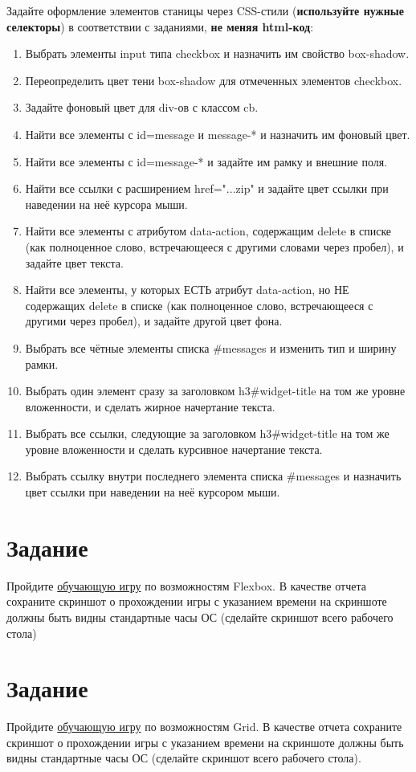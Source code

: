 \documentclass[a4paper,12pt]{extarticle}
\begin{document}
Задайте оформление элементов станицы через CSS-стили (\textbf{используйте нужные селекторы}) в
соответствии с заданиями, \textbf{не меняя html-код}:
\begin{enumerate}
  \item Выбрать элементы input типа checkbox и назначить им свойство box-shadow.
  \item Переопределить цвет тени box-shadow для отмеченных элементов checkbox.
  \item Задайте фоновый цвет для div-ов с классом cb.
  \item Найти все элементы с id=message и message-* и назначить им фоновый цвет.
  \item Найти все элементы с id=message-* и задайте им рамку и внешние поля.
  \item Найти все ссылки с расширением href="...zip" и задайте цвет ссылки при наведении на неё курсора мыши.
  \item Найти все элементы с атрибутом data-action, содержащим delete в списке (как полноценное слово, встречающееся с другими словами через пробел), и задайте цвет текста.
  \item Найти все элементы, у которых ЕСТЬ атрибут data-action, но НЕ содержащих delete в списке (как полноценное слово, встречающееся с другими через пробел), и задайте другой цвет фона.
  \item Выбрать все чётные элементы списка \#messages и изменить тип и ширину рамки.
  \item Выбрать один элемент сразу за заголовком h3\#widget-title на том же уровне вложенности, и сделать жирное начертание текста.
  \item Выбрать все ссылки, следующие за заголовком h3\#widget-title на том же уровне вложенности и сделать курсивное начертание текста.
  \item Выбрать ссылку внутри последнего элемента списка \#messages и назначить цвет ссылки при наведении на неё курсором мыши.
\end{enumerate}

\section{Задание}
Пройдите \href{https://flexboxfroggy.com/#ru}{обучающую игру} по возможностям Flexbox. В качестве отчета сохраните
скриншот о прохождении игры с указанием времени на скриншоте должны быть видны
стандартные часы ОС (сделайте скриншот всего рабочего стола)

\section{Задание}
Пройдите \href{https://cssgridgarden.com/#ru}{обучающую игру} по возможностям Grid. В качестве отчета сохраните
скриншот о прохождении игры с указанием времени на скриншоте должны быть видны
стандартные часы ОС (сделайте скриншот всего рабочего стола).
\end{document}
